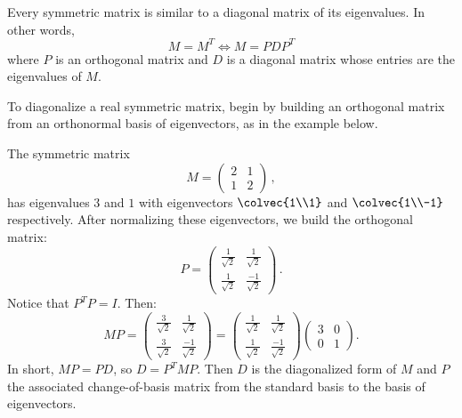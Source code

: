 \begin{theorem}
Every symmetric matrix is similar to a diagonal matrix of its eigenvalues.  In other words,
\[
M=M^T \Leftrightarrow M=PDP^T
\]
where $P$ is an orthogonal matrix and $D$ is a diagonal matrix whose entries are the eigenvalues of $M$.
\end{theorem}


To diagonalize a real symmetric matrix, begin by building an orthogonal matrix from an orthonormal basis of eigenvectors, as in the example below. 

\begin{example}
The symmetric matrix 
\[M=\begin{pmatrix}2&1\\1&2\end{pmatrix}\,  ,\] has eigenvalues $3$ and $1$ with eigenvectors $\colvec{1\\1}$ and $\colvec{1\\-1}$ respectively.  After normalizing these eigenvectors, we  build the orthogonal matrix:
\[
P = \begin{pmatrix}
\frac{1}{\sqrt{2}} & \frac{1}{\sqrt{2}} \\[2mm]
\frac{1}{\sqrt{2}} & \frac{-1}{\sqrt{2}}
\end{pmatrix}\, .
\]
Notice that $P^TP=I$.  Then:
\[
MP = \begin{pmatrix}
\frac{3}{\sqrt{2}} & \frac{1}{\sqrt{2}} \\[2mm]
\frac{3}{\sqrt{2}} & \frac{-1}{\sqrt{2}}
\end{pmatrix} = 
\begin{pmatrix}
\frac{1}{\sqrt{2}} & \frac{1}{\sqrt{2}} \\[2mm]
\frac{1}{\sqrt{2}} & \frac{-1}{\sqrt{2}}
\end{pmatrix} \begin{pmatrix}
3 & 0 \\[2mm]
0 & 1
\end{pmatrix}.
\]
In short, $MP=PD$, so $D=P^TMP$.  Then $D$ is the diagonalized form of $M$ and $P$ the associated change-of-basis matrix from the standard basis to the basis of eigenvectors.
\end{example}













